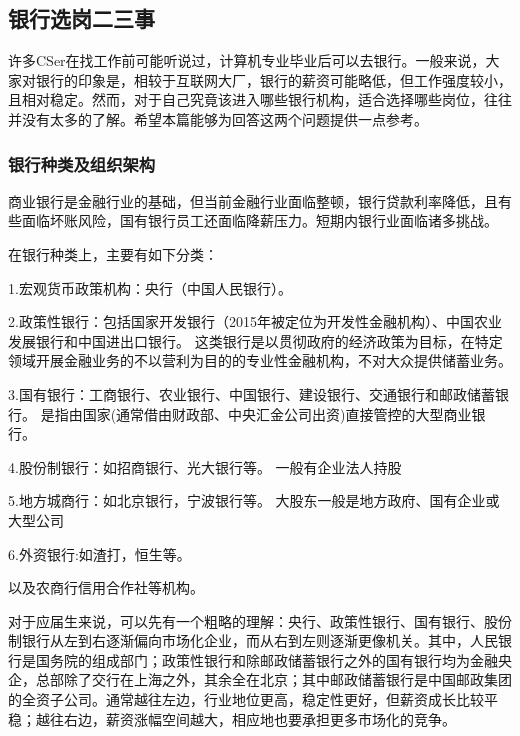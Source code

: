  



\subsection{银行选岗二三事}



许多CSer在找工作前可能听说过，计算机专业毕业后可以去银行。一般来说，大家对银行的印象是，相较于互联网大厂，银行的薪资可能略低，但工作强度较小，且相对稳定。然而，对于自己究竟该进入哪些银行机构，适合选择哪些岗位，往往并没有太多的了解。希望本篇能够为回答这两个问题提供一点参考。

\subsubsection{银行种类及组织架构}
商业银行是金融行业的基础，但当前金融行业面临整顿，银行贷款利率降低，且有些面临坏账风险，国有银行员工还面临降薪压力。短期内银行业面临诸多挑战。

在银行种类上，主要有如下分类：

1.宏观货币政策机构：央行（中国人民银行）。

2.政策性银行：包括国家开发银行（2015年被定位为开发性金融机构）、中国农业发展银行和中国进出口银行。
这类银行是以贯彻政府的经济政策为目标，在特定领域开展金融业务的不以营利为目的的专业性金融机构，不对大众提供储蓄业务。

3.国有银行：工商银行、农业银行、中国银行、建设银行、交通银行和邮政储蓄银行。
是指由国家(通常借由财政部、中央汇金公司出资)直接管控的大型商业银行。

4.股份制银行：如招商银行、光大银行等。
一般有企业法人持股

5.地方城商行：如北京银行，宁波银行等。
大股东一般是地方政府、国有企业或大型公司

6.外资银行:如渣打，恒生等。


以及农商行信用合作社等机构。

对于应届生来说，可以先有一个粗略的理解：央行、政策性银行、国有银行、股份制银行从左到右逐渐偏向市场化企业，而从右到左则逐渐更像机关。其中，人民银行是国务院的组成部门；政策性银行和除邮政储蓄银行之外的国有银行均为金融央企，总部除了交行在上海之外，其余全在北京；其中邮政储蓄银行是中国邮政集团的全资子公司。通常越往左边，行业地位更高，稳定性更好，但薪资成长比较平稳；越往右边，薪资涨幅空间越大，相应地也要承担更多市场化的竞争。





